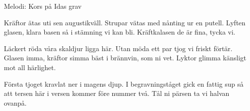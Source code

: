 \begin{song}

\begin{songmeta}
Melodi: Kors på Idas grav
\end{songmeta}

\begin{songtext}
Kräftor ätas uti sen augustikväll.
Strupar vätas med nånting ur en putell.
Lyften glasen, klara basen
så i stämning vi kan bli.
Kräftkalasen de är fina, tycka vi.

Läckert röda våra skaldjur ligga här.
Utan möda ett par tjog vi friskt förtär.
Glasen imma, kräftor simma
bäst i brännvin, som ni vet.
Lyktor glimma känsligt mot all härlighet.

Första tjoget kravlat ner i magens djup.
I begravningståget gick en fattig sup
så att tersen här i versen
kommer före nummer två.
Tål ni pärsen ta vi halvan ovanpå.
\end{songtext}

\end{song}
